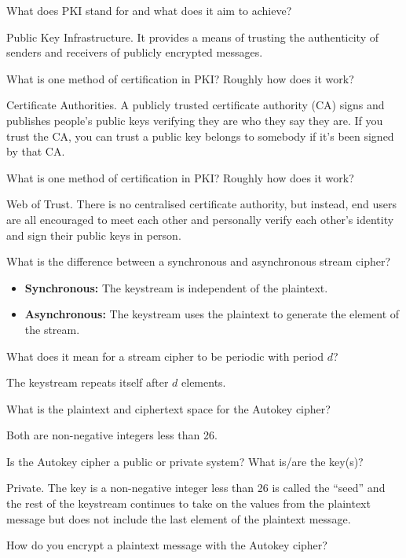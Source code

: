 \documentclass{article}
\newcounter{qcounter}
\newcommand{\showqcounter}{\theqcounter}
\newcommand{\question}{\vspace{5mm}\addtocounter{qcounter}{1}\vspace{5mm}{\bf Q\showqcounter: }}
\newcommand{\answer}{\vspace{5mm}{\bf A\showqcounter: }}
\begin{document}
\question What does PKI stand for and what does it aim to achieve?

\answer Public Key Infrastructure. It provides a means of trusting the authenticity of senders and receivers of publicly encrypted messages.


\question What is one method of certification in PKI? Roughly how does it work?

\answer Certificate Authorities. A publicly trusted certificate authority (CA) signs and publishes people's public keys verifying they are 
  who they say they are. If you trust the CA, you can trust a public key belongs to somebody if it's been signed by that CA.


\question What is one method of certification in PKI? Roughly how does it work?

\answer Web of Trust. There is no centralised certificate authority, but instead, end users are all encouraged to meet each other and personally 
  verify each other's identity and sign their public keys in person.


\question What is the difference between a synchronous and asynchronous stream cipher?

\answer 
  \begin{itemize}
    \item {\bf Synchronous:} The keystream is independent of the plaintext.
    \item {\bf Asynchronous:} The keystream uses the plaintext to generate the element of the stream.
  \end{itemize}

  
\question What does it mean for a stream cipher to be periodic with period $d$?

\answer The keystream repeats itself after $d$ elements.


\question What is the plaintext and ciphertext space for the Autokey cipher?

\answer Both are non-negative integers less than 26.


\question Is the Autokey cipher a public or private system? What is/are the key(s)?

\answer Private. The key is a non-negative integer less than 26 is called the ``seed'' and the rest of the keystream continues to take on 
  the values from the plaintext message but does not include the last element of the plaintext message.


\question How do you encrypt a plaintext message with the Autokey cipher?
\end{document}

